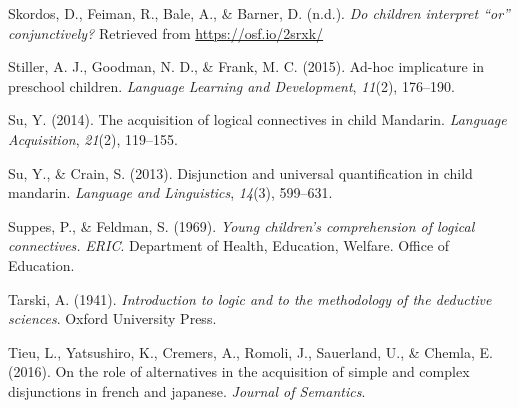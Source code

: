 \documentclass[,man,floatsintext]{apa6}
\begin{document}
\leavevmode\hypertarget{ref-skordosEtal2018}{}%
Skordos, D., Feiman, R., Bale, A., \& Barner, D. (n.d.). \emph{Do children interpret ``or'' conjunctively?} Retrieved from \url{https://osf.io/2srxk/}

\leavevmode\hypertarget{ref-stiller2015ad}{}%
Stiller, A. J., Goodman, N. D., \& Frank, M. C. (2015). Ad-hoc implicature in preschool children. \emph{Language Learning and Development}, \emph{11}(2), 176--190.

\leavevmode\hypertarget{ref-su2014acquisition}{}%
Su, Y. (2014). The acquisition of logical connectives in child Mandarin. \emph{Language Acquisition}, \emph{21}(2), 119--155.

\leavevmode\hypertarget{ref-su2013disjunction}{}%
Su, Y., \& Crain, S. (2013). Disjunction and universal quantification in child mandarin. \emph{Language and Linguistics}, \emph{14}(3), 599--631.

\leavevmode\hypertarget{ref-suppes1969young}{}%
Suppes, P., \& Feldman, S. (1969). \emph{Young children's comprehension of logical connectives.} \emph{ERIC}. Department of Health, Education, Welfare. Office of Education.

\leavevmode\hypertarget{ref-tarski1941logic}{}%
Tarski, A. (1941). \emph{Introduction to logic and to the methodology of the deductive sciences}. Oxford University Press.

\leavevmode\hypertarget{ref-tieu2016}{}%
Tieu, L., Yatsushiro, K., Cremers, A., Romoli, J., Sauerland, U., \& Chemla, E. (2016). On the role of alternatives in the acquisition of simple and complex disjunctions in french and japanese. \emph{Journal of Semantics}.
\end{document}
